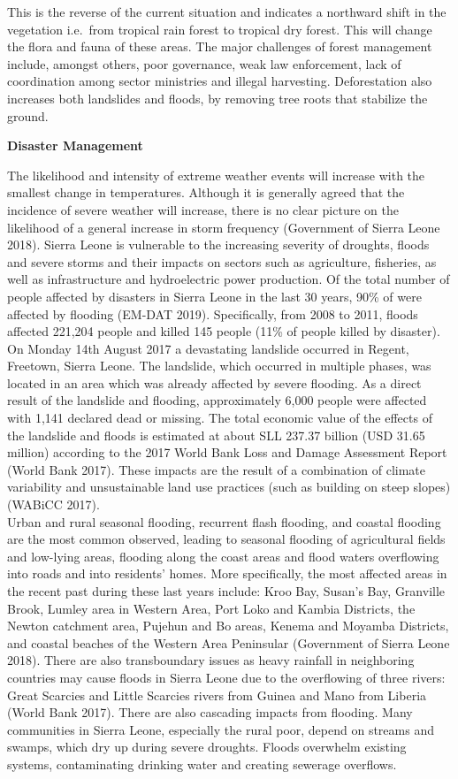 \documentclass[
]{book}
\begin{document}
This is the reverse of the current situation and indicates a northward shift in the vegetation i.e.~from tropical rain forest to tropical dry forest. This will change the flora and fauna of these areas. The major challenges of forest management include, amongst others, poor governance, weak law enforcement, lack of coordination among sector ministries and illegal harvesting. Deforestation also increases both landslides and floods, by removing tree roots that stabilize the ground.

\textbf{Disaster Management}

The likelihood and intensity of extreme weather events will increase with the smallest change in temperatures. Although it is generally agreed that the incidence of severe weather will increase, there is no clear picture on the likelihood of a general increase in storm frequency (Government of Sierra Leone 2018). Sierra Leone is vulnerable to the increasing severity of droughts, floods and severe storms and their impacts on sectors such as agriculture, fisheries, as well as infrastructure and hydroelectric power production. Of the total number of people affected by disasters in Sierra Leone in the last 30 years, 90\% of were affected by flooding (EM-DAT 2019). Specifically, from 2008 to 2011, floods affected 221,204 people and killed 145 people (11\% of people killed by disaster). On Monday 14th August 2017 a devastating landslide occurred in Regent, Freetown, Sierra Leone. The landslide, which occurred in multiple phases, was located in an area which was already affected by severe flooding. As a direct result of the landslide and flooding, approximately 6,000 people were affected with 1,141 declared dead or missing. The total economic value of the effects of the landslide and floods is estimated at about SLL 237.37 billion (USD 31.65 million) according to the 2017 World Bank Loss and Damage Assessment Report (World Bank 2017). These impacts are the result of a combination of climate variability and unsustainable land use practices (such as building on steep slopes) (WABiCC 2017).\\
Urban and rural seasonal flooding, recurrent flash flooding, and coastal flooding are the most common observed, leading to seasonal flooding of agricultural fields and low-lying areas, flooding along the coast areas and flood waters overflowing into roads and into residents' homes. More specifically, the most affected areas in the recent past during these last years include: Kroo Bay, Susan's Bay, Granville Brook, Lumley area in Western Area, Port Loko and Kambia Districts, the Newton catchment area, Pujehun and Bo areas, Kenema and Moyamba Districts, and coastal beaches of the Western Area Peninsular (Government of Sierra Leone 2018). There are also transboundary issues as heavy rainfall in neighboring countries may cause floods in Sierra Leone due to the overflowing of three rivers: Great Scarcies and Little Scarcies rivers from Guinea and Mano from Liberia (World Bank 2017). There are also cascading impacts from flooding. Many communities in Sierra Leone, especially the rural poor, depend on streams and swamps, which dry up during severe droughts. Floods overwhelm existing systems, contaminating drinking water and creating sewerage overflows.
\end{document}
